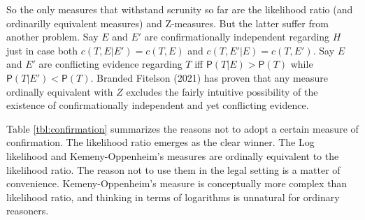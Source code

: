 \documentclass[
  letterpaper,
  DIV=11,
  numbers=noendperiod]{scrartcl}
\newcommand{\pr}[1]{\mathsf{P}(#1)}
\begin{document}
So the only measures that withstand scrunity so far are the likelihood
ratio (and ordinarilly equivalent measures) and Z-measures. But the
latter suffer from another problem. Say \(E\) and \(E'\) are
confirmationally independent regarding \(H\) just in case both
\(c(T, E \vert E' ) = c(T, E )\) and \(c(T, E' \vert E ) = c(T, E')\).
Say \(E\) and \(E'\) are conflicting evidence regarding \(T\) iff
\(\pr{T\vert E}> \pr{T}\) while \(\pr{T\vert E'} < \pr{T}\). Branded
Fitelson (2021) has proven that any measure ordinally equivalent with
\(Z\) excludes the fairly intuitive possibility of the existence of
confirmationally independent and yet conflicting evidence.

Table \ref{tbl:confirmation} summarizes the reasons not to adopt a
certain measure of confirmation. The likelihood ratio emerges as the
clear winner. The Log likelihood and Kemeny-Oppenheim's measures are
ordinally equivalent to the likelihood ratio. The reason not to use them
in the legal setting is a matter of convenience. Kemeny-Oppenheim's
measure is conceptually more complex than likelihood ratio, and thinking
in terms of logarithms is unnatural for ordinary reasoners.
\end{document}
